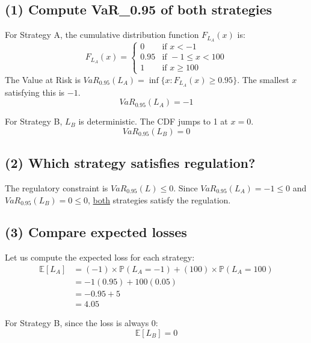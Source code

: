 \subsection{(1) Compute VaR\_0.95 of both strategies}

For Strategy A, the cumulative distribution function $F_{L_A}(x)$ is:
\begin{equation*}
F_{L_A}(x) = 
\begin{cases} 
0 & \text{if } x < -1 \\
0.95 & \text{if } -1 \le x < 100 \\
1 & \text{if } x \ge 100 
\end{cases}
\end{equation*}
The Value at Risk is $VaR_{0.95}(L_A) = \inf\{x : F_{L_A}(x) \ge 0.95\}$. The smallest $x$ satisfying this is $-1$.
\begin{equation*}
VaR_{0.95}(L_A) = -1
\end{equation*}

For Strategy B, $L_B$ is deterministic. The CDF jumps to 1 at $x=0$.
\begin{equation*}
VaR_{0.95}(L_B) = 0
\end{equation*}


\subsection{(2) Which strategy satisfies regulation?}

The regulatory constraint is $VaR_{0.95}(L) \le 0$.
Since $VaR_{0.95}(L_A) = -1 \le 0$ and $VaR_{0.95}(L_B) = 0 \le 0$, \underline{both} strategies satisfy the regulation.


\subsection{(3) Compare expected losses}

Let us compute the expected loss for each strategy:
\begin{align*}
\mathbb{E}[L_A] &= (-1) \times \mathbb{P}(L_A = -1) + (100) \times \mathbb{P}(L_A = 100) \\
&= -1(0.95) + 100(0.05) \\
&= -0.95 + 5 \\
&= 4.05
\end{align*}

For Strategy B, since the loss is always 0:
\begin{equation*}
\mathbb{E}[L_B] = 0
\end{equation*}

